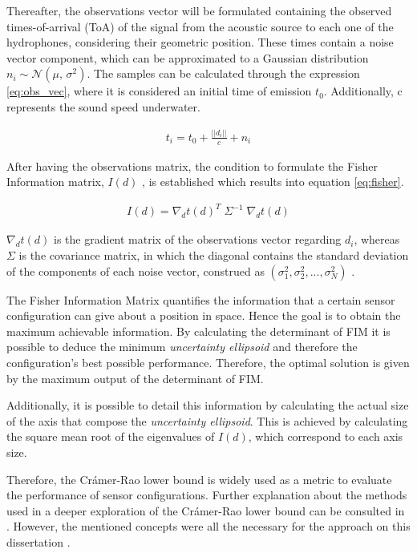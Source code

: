Thereafter, the observations vector will be formulated containing the observed times-of-arrival (ToA) of the signal from the acoustic source to each one of the hydrophones, considering their geometric position. These times contain a noise vector component, which can be approximated to a Gaussian distribution $n_i \sim \mathcal{N}(\mu,\,\sigma^{2})$. The samples can be calculated through the expression \ref{eq:obs_vec}, where it is considered an initial time of emission $t_0$. Additionally, c represents the sound speed underwater.

\begin{eqnarray}
	t_i = t_0 + \frac{||d_i||}{c} + n_i
	\label{eq:obs_vec}
\end{eqnarray}

After having the observations matrix, the condition to formulate the Fisher Information matrix, $I(d)$ , is established which results into equation \ref{eq:fisher}.

\begin{eqnarray}
	I(d) = \nabla_{d}t(d)^T \; \Sigma^{-1} \; \nabla_{d}t(d)
	\label{eq:fisher}
\end{eqnarray}

$\nabla_{d}t(d)$ is the gradient matrix of the observations vector regarding $d_i$, whereas $\Sigma$ is the covariance matrix, in which the diagonal contains the standard deviation of the components of each noise vector, construed as $(\sigma_1^2 , \sigma_2^2 , ... , \sigma_N^2)$ .

The Fisher Information Matrix quantifies the information that a certain sensor configuration can give about a position in space. Hence the goal is to obtain the maximum achievable information. By calculating the determinant of FIM it is possible to deduce the minimum \textit{uncertainty ellipsoid} and therefore the configuration's best possible performance. Therefore, the optimal solution is given by the maximum output of the determinant of FIM.

Additionally, it is possible to detail this information by calculating the actual size of the axis that compose the \textit{uncertainty ellipsoid}. This is achieved by calculating the square mean root of the eigenvalues of $I(d)$, which correspond to each axis size.

Therefore, the Crámer-Rao lower bound is widely used as a metric to evaluate the performance of sensor configurations. Further explanation about the methods used in a deeper exploration of the Crámer-Rao lower bound can be consulted in \cite{bishop-cramer-rao}. However, the mentioned concepts were all the necessary for the approach on this dissertation .


